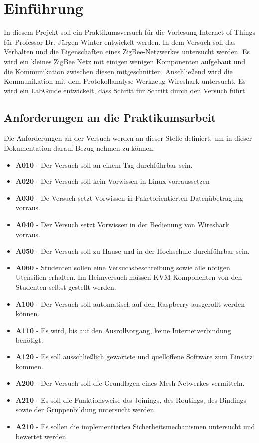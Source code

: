 \chapter{Einführung}

In diesem Projekt soll ein Praktikumsversuch für die Vorlesung Internet of Things für Professor Dr. Jürgen Winter 
entwickelt werden. In dem Versuch soll das Verhalten und die Eigenschaften eines ZigBee-Netzwerkes untersucht werden. Es wird ein kleines
ZigBee Netz mit einigen wenigen Komponenten aufgebaut und die Kommunikation zwischen diesen mitgeschnitten. Anschließend wird die
Kommunikation mit dem Protokollanalyse Werkzeug Wireshark untersucht. Es wird ein \grqq LabGuide \grqq{} entwickelt,
dass Schritt für Schritt durch den Versuch führt.

\section{Anforderungen an die Praktikumsarbeit}

Die Anforderungen an der Versuch werden an dieser Stelle definiert, um in dieser Dokumentation 
darauf Bezug nehmen zu können.
\begin{itemize}
    \item \textbf{A010} - Der Versuch soll an einem Tag durchführbar sein.
    \item \textbf{A020} - Der Versuch soll kein Vorwissen in Linux vorraussetzen
    \item \textbf{A030} - De Versuch setzt Vorwissen in Paketorientierten Datenübetragung vorraus.
    \item \textbf{A040} - Der Versuch setzt Vorwissen in der Bedienung von Wireshark vorraus.
    \item \textbf{A050} - Der Versuch soll zu Hause und in der Hochschule durchführbar sein.
    \item \textbf{A060} - Studenten sollen eine Versuchsbeschreibung sowie alle nötigen Utensilien erhalten. Im Heimversuch müssen KVM-Komponenten von den Studenten selbst gestellt werden.
    \item \textbf{A100} - Der Versuch soll automatisch auf den Raspberry ausgerollt werden können.
    \item \textbf{A110} - Es wird, bis auf den Ausrollvorgang, keine Internetverbindung benötigt.
    \item \textbf{A120} - Es soll ausschließlich gewartete und quelloffene Software zum Einsatz kommen.
    \item \textbf{A200} - Der Versuch soll die Grundlagen eines Mesh-Netwerkes vermitteln.
    \item \textbf{A210} - Es soll die Funktionsweise des Joinings, des Routings, des Bindings sowie der Gruppenbildung untersucht werden.
    \item \textbf{A210} - Es sollen die implementierten Sicherheitsmechanismen untersucht und bewertet werden.
\end{itemize}

